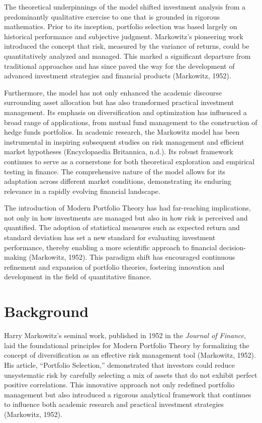 \documentclass[11pt]{article}
\begin{document}
The theoretical underpinnings of the model shifted investment analysis from a predominantly qualitative exercise to one that is grounded in rigorous mathematics. Prior to its inception, portfolio selection was based largely on historical performance and subjective judgment. Markowitz's pioneering work introduced the concept that risk, measured by the variance of returns, could be quantitatively analyzed and managed. This marked a significant departure from traditional approaches and has since paved the way for the development of advanced investment strategies and financial products (Markowitz, 1952).

Furthermore, the model has not only enhanced the academic discourse surrounding asset allocation but has also transformed practical investment management. Its emphasis on diversification and optimization has influenced a broad range of applications, from mutual fund management to the construction of hedge funds portfolios. In academic research, the Markowitz model has been instrumental in inspiring subsequent studies on risk management and efficient market hypotheses (Encyclopaedia Britannica, n.d.). Its robust framework continues to serve as a cornerstone for both theoretical exploration and empirical testing in finance. The comprehensive nature of the model allows for its adaptation across different market conditions, demonstrating its enduring relevance in a rapidly evolving financial landscape.

The introduction of Modern Portfolio Theory has had far-reaching implications, not only in how investments are managed but also in how risk is perceived and quantified. The adoption of statistical measures such as expected return and standard deviation has set a new standard for evaluating investment performance, thereby enabling a more scientific approach to financial decision-making (Markowitz, 1952). This paradigm shift has encouraged continuous refinement and expansion of portfolio theories, fostering innovation and development in the field of quantitative finance.

\section{Background}
Harry Markowitz's seminal work, published in 1952 in the \textit{Journal of Finance}, laid the foundational principles for Modern Portfolio Theory by formalizing the concept of diversification as an effective risk management tool (Markowitz, 1952). His article, ``Portfolio Selection,'' demonstrated that investors could reduce unsystematic risk by carefully selecting a mix of assets that do not exhibit perfect positive correlations. This innovative approach not only redefined portfolio management but also introduced a rigorous analytical framework that continues to influence both academic research and practical investment strategies (Markowitz, 1952).
\end{document}

